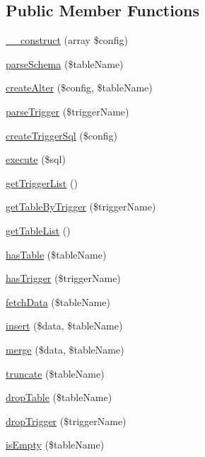 \subsection*{Public Member Functions}
\begin{DoxyCompactItemize}
\item 
\hyperlink{interfaceDbSync__DbAdapter__AdapterInterface_a29aeee3cbdac7e08ca3c08f464f5b443}{\_\-\_\-construct} (array \$config)
\item 
\hyperlink{interfaceDbSync__DbAdapter__AdapterInterface_a683e550d89b21e02e4068993f30079fc}{parseSchema} (\$tableName)
\item 
\hyperlink{interfaceDbSync__DbAdapter__AdapterInterface_acc0350206ef7c623402bb19633ad3f6a}{createAlter} (\$config, \$tableName)
\item 
\hyperlink{interfaceDbSync__DbAdapter__AdapterInterface_acea54c81f65be6ea4eceb8dcf3b93659}{parseTrigger} (\$triggerName)
\item 
\hyperlink{interfaceDbSync__DbAdapter__AdapterInterface_a2efd82563860bf45fc07fbeb4d67b056}{createTriggerSql} (\$config)
\item 
\hyperlink{interfaceDbSync__DbAdapter__AdapterInterface_a4e19047119e11123e47f8c8c14e0c665}{execute} (\$sql)
\item 
\hyperlink{interfaceDbSync__DbAdapter__AdapterInterface_a686c3e752907a09cc1d87fce2d2bb101}{getTriggerList} ()
\item 
\hyperlink{interfaceDbSync__DbAdapter__AdapterInterface_a6df405111c98ca40324423f8981d7974}{getTableByTrigger} (\$triggerName)
\item 
\hyperlink{interfaceDbSync__DbAdapter__AdapterInterface_a84b87f76dc8ebc123d42dda7393e0cb9}{getTableList} ()
\item 
\hyperlink{interfaceDbSync__DbAdapter__AdapterInterface_ac1cb4888b127b104ed231feae87d3056}{hasTable} (\$tableName)
\item 
\hyperlink{interfaceDbSync__DbAdapter__AdapterInterface_aa8f4119b6cc6cf5bfd0d97d45a849d9d}{hasTrigger} (\$triggerName)
\item 
\hyperlink{interfaceDbSync__DbAdapter__AdapterInterface_ad60b6d7e34fba4e763132e47134b35e1}{fetchData} (\$tableName)
\item 
\hyperlink{interfaceDbSync__DbAdapter__AdapterInterface_ad535c5d4d074383feb578fab1e71d2e7}{insert} (\$data, \$tableName)
\item 
\hyperlink{interfaceDbSync__DbAdapter__AdapterInterface_a06dfb3597de81841661535373ce06e0d}{merge} (\$data, \$tableName)
\item 
\hyperlink{interfaceDbSync__DbAdapter__AdapterInterface_a2cc0eb5ae7c4aa0b69a899e84040da83}{truncate} (\$tableName)
\item 
\hyperlink{interfaceDbSync__DbAdapter__AdapterInterface_a18ccca4e55a874ed85acd00506f4fff2}{dropTable} (\$tableName)
\item 
\hyperlink{interfaceDbSync__DbAdapter__AdapterInterface_afb0b32f718a3a499955444966929997b}{dropTrigger} (\$triggerName)
\item 
\hyperlink{interfaceDbSync__DbAdapter__AdapterInterface_abe0d20fb62067de68fb354adc3eb7e8a}{isEmpty} (\$tableName)
\end{DoxyCompactItemize}


